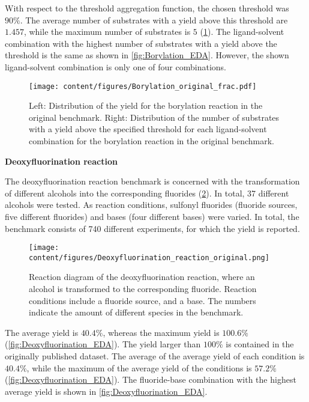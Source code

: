 With respect to the threshold aggregation function, the chosen threshold was $90\%$.
The average number of substrates with a yield above this threshold are $1.457$, while the maximum number of substrates is $5$ (\cref{fig:Borylation_EDA_frac}).
The ligand-solvent combination with the highest number of substrates with a yield above the threshold is the same as shown in \cref{fig:Borylation_EDA}. However, the shown ligand-solvent combination is only one of four combinations.

\begin{figure}[h]
    \centering
    \texttt{[image: content/figures/Borylation\_original\_frac.pdf]}
    \caption{Left: Distribution of the yield for the borylation reaction in the original benchmark. Right: Distribution of the number of substrates with a yield above the specified threshold for each ligand-solvent combination for the borylation reaction in the original benchmark.}
    \label{fig:Borylation_EDA_frac}
\end{figure}
\newpage
\textbf{Deoxyfluorination reaction}

The deoxyfluorination reaction benchmark is concerned with the transformation of different alcohols into the corresponding fluorides (\cref{fig:Deoxyfluorination_reaction}). 
In total, 37 different alcohols were tested. 
As reaction conditions, sulfonyl fluorides (fluoride sources, five different fluorides) and bases (four different bases) were varied. 
In total, the benchmark consists of 740 different experiments, for which the yield is reported.

\begin{figure}[h]
    \centering
    \texttt{[image: content/figures/Deoxyfluorination\_reaction\_original.png]}
    \caption{Reaction diagram of the deoxyfluorination reaction, where an alcohol is transformed to the corresponding fluoride. Reaction conditions include a fluoride source, and a base. The numbers indicate the amount of different species in the benchmark.}
    \label{fig:Deoxyfluorination_reaction}
\end{figure}

The average yield is $40.4\%$, whereas the maximum yield is $100.6\%$ (\cref{fig:Deoxyfluorination_EDA}).
The yield larger than $100\%$ is contained in the originally published dataset.
The average of the average yield of each condition is $40.4\%$, while the maximum of the average yield of the conditions is $57.2\%$ (\cref{fig:Deoxyfluorination_EDA}).
The fluoride-base combination with the highest average yield is shown in \cref{fig:Deoxyfluorination_EDA}.

